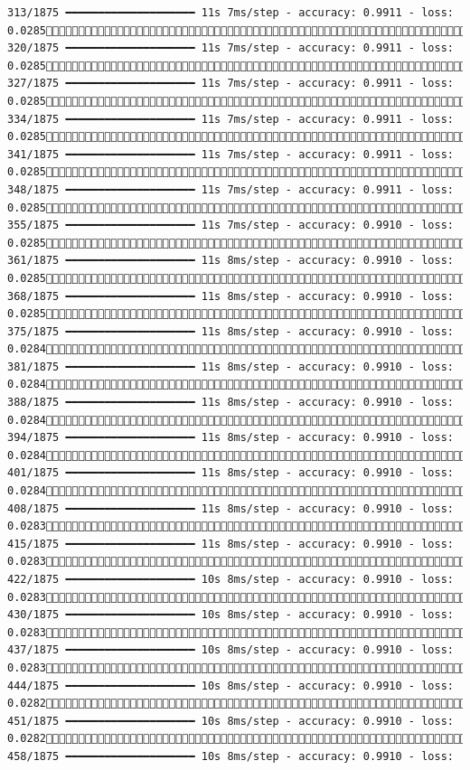 \documentclass[
  letterpaper,
  DIV=11,
  numbers=noendperiod]{scrreprt}
\begin{document}
\begin{verbatim}
313/1875 ━━━━━━━━━━━━━━━━━━━━ 11s 7ms/step - accuracy: 0.9911 - loss: 0.0285 320/1875 ━━━━━━━━━━━━━━━━━━━━ 11s 7ms/step - accuracy: 0.9911 - loss: 0.0285 327/1875 ━━━━━━━━━━━━━━━━━━━━ 11s 7ms/step - accuracy: 0.9911 - loss: 0.0285 334/1875 ━━━━━━━━━━━━━━━━━━━━ 11s 7ms/step - accuracy: 0.9911 - loss: 0.0285 341/1875 ━━━━━━━━━━━━━━━━━━━━ 11s 7ms/step - accuracy: 0.9911 - loss: 0.0285 348/1875 ━━━━━━━━━━━━━━━━━━━━ 11s 7ms/step - accuracy: 0.9911 - loss: 0.0285 355/1875 ━━━━━━━━━━━━━━━━━━━━ 11s 7ms/step - accuracy: 0.9910 - loss: 0.0285 361/1875 ━━━━━━━━━━━━━━━━━━━━ 11s 8ms/step - accuracy: 0.9910 - loss: 0.0285 368/1875 ━━━━━━━━━━━━━━━━━━━━ 11s 8ms/step - accuracy: 0.9910 - loss: 0.0285 375/1875 ━━━━━━━━━━━━━━━━━━━━ 11s 8ms/step - accuracy: 0.9910 - loss: 0.0284 381/1875 ━━━━━━━━━━━━━━━━━━━━ 11s 8ms/step - accuracy: 0.9910 - loss: 0.0284 388/1875 ━━━━━━━━━━━━━━━━━━━━ 11s 8ms/step - accuracy: 0.9910 - loss: 0.0284 394/1875 ━━━━━━━━━━━━━━━━━━━━ 11s 8ms/step - accuracy: 0.9910 - loss: 0.0284 401/1875 ━━━━━━━━━━━━━━━━━━━━ 11s 8ms/step - accuracy: 0.9910 - loss: 0.0284 408/1875 ━━━━━━━━━━━━━━━━━━━━ 11s 8ms/step - accuracy: 0.9910 - loss: 0.0283 415/1875 ━━━━━━━━━━━━━━━━━━━━ 11s 8ms/step - accuracy: 0.9910 - loss: 0.0283 422/1875 ━━━━━━━━━━━━━━━━━━━━ 10s 8ms/step - accuracy: 0.9910 - loss: 0.0283 430/1875 ━━━━━━━━━━━━━━━━━━━━ 10s 8ms/step - accuracy: 0.9910 - loss: 0.0283 437/1875 ━━━━━━━━━━━━━━━━━━━━ 10s 8ms/step - accuracy: 0.9910 - loss: 0.0283 444/1875 ━━━━━━━━━━━━━━━━━━━━ 10s 8ms/step - accuracy: 0.9910 - loss: 0.0282 451/1875 ━━━━━━━━━━━━━━━━━━━━ 10s 8ms/step - accuracy: 0.9910 - loss: 0.0282 458/1875 ━━━━━━━━━━━━━━━━━━━━ 10s 8ms/step - accuracy: 0.9910 - loss: 
\end{verbatim}
\end{document}
